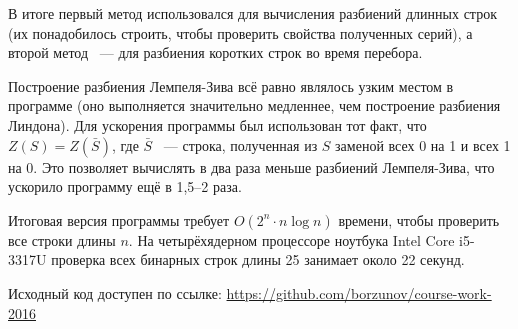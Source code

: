 В итоге первый метод использовался для вычисления разбиений длинных строк (их понадобилось строить, чтобы проверить свойства полученных серий), а второй метод ~--- для разбиения коротких строк во время перебора.

Построение разбиения Лемпеля-Зива всё равно являлось узким местом в программе (оно выполняется значительно медленнее, чем построение разбиения Линдона). Для ускорения программы был использован тот факт, что $ Z(S) = Z(\bar S) $, где $ \bar S $ ~--- строка, полученная из $ S $ заменой всех 0 на 1 и всех 1 на 0. Это позволяет вычислять в два раза меньше разбиений Лемпеля-Зива, что ускорило программу ещё в 1,5--2 раза.

Итоговая версия программы требует $ O(2^n \cdot n \log n) $ времени, чтобы проверить все строки длины $n$. На четырёхядерном процессоре ноутбука Intel Core i5-3317U проверка всех бинарных строк длины 25 занимает около 22 секунд.

Исходный код доступен по ссылке: \url{https://github.com/borzunov/course-work-2016}
